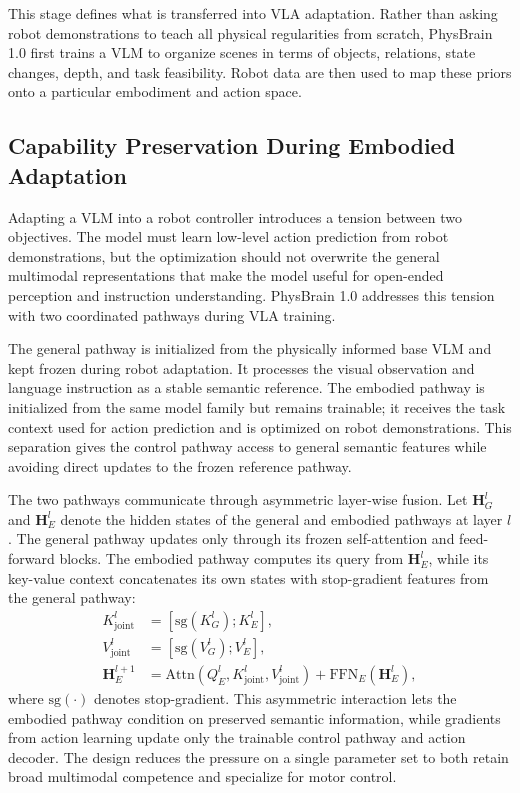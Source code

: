 This stage defines what is transferred into VLA adaptation. Rather than asking robot demonstrations to teach all physical regularities from scratch, PhysBrain 1.0 first trains a VLM to organize scenes in terms of objects, relations, state changes, depth, and task feasibility. Robot data are then used to map these priors onto a particular embodiment and action space.

\subsection{Capability Preservation During Embodied Adaptation}

Adapting a VLM into a robot controller introduces a tension between two objectives. The model must learn low-level action prediction from robot demonstrations, but the optimization should not overwrite the general multimodal representations that make the model useful for open-ended perception and instruction understanding. PhysBrain 1.0 addresses this tension with two coordinated pathways during VLA training.

The general pathway is initialized from the physically informed base VLM and kept frozen during robot adaptation. It processes the visual observation and language instruction as a stable semantic reference. The embodied pathway is initialized from the same model family but remains trainable; it receives the task context used for action prediction and is optimized on robot demonstrations. This separation gives the control pathway access to general semantic features while avoiding direct updates to the frozen reference pathway.

The two pathways communicate through asymmetric layer-wise fusion. Let $\mathbf{H}_G^l$ and $\mathbf{H}_E^l$ denote the hidden states of the general and embodied pathways at layer $l$. The general pathway updates only through its frozen self-attention and feed-forward blocks. The embodied pathway computes its query from $\mathbf{H}_E^l$, while its key-value context concatenates its own states with stop-gradient features from the general pathway:
\begin{align}
    K_{\mathrm{joint}}^l &= [\mathrm{sg}(K_G^l); K_E^l], \\
    V_{\mathrm{joint}}^l &= [\mathrm{sg}(V_G^l); V_E^l], \\
    \mathbf{H}_E^{l+1} &= \mathrm{Attn}(Q_E^l, K_{\mathrm{joint}}^l, V_{\mathrm{joint}}^l) + \mathrm{FFN}_E(\mathbf{H}_E^l),
\end{align}
where $\mathrm{sg}(\cdot)$ denotes stop-gradient. This asymmetric interaction lets the embodied pathway condition on preserved semantic information, while gradients from action learning update only the trainable control pathway and action decoder. The design reduces the pressure on a single parameter set to both retain broad multimodal competence and specialize for motor control.

